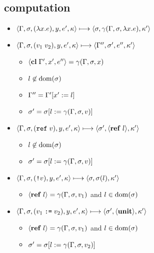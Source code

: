 \documentclass{article}
\begin{document}
\begin{minipage}{\textwidth}
\begin{minipage}[t]{0.50\textwidth}

\subsection{computation}
\begin{itemize}
\item $\langle\Gamma,\sigma,(\lambda x.e),y,e',\kappa\rangle \longmapsto \langle \sigma,\gamma(\Gamma,\sigma,\lambda x.e), \kappa'\rangle$
\item $\langle\Gamma,\sigma,(v_1\;v_2),y,e',\kappa\rangle \longmapsto \langle\Gamma'',\sigma',e'',\kappa'\rangle$

\begin{itemize}
\item $\langle\mathbf{cl}\; \Gamma',x',e''\rangle=\gamma(\Gamma,\sigma,x)$
\item $l\not\in\operatorname{dom}(\sigma)$
\item $\Gamma''=\Gamma'[x':= l]$
\item $\sigma'=\sigma[l:= \gamma(\Gamma,\sigma,v)]$
\end{itemize}

\item $\langle\Gamma,\sigma,(\mathtt{ref}\; v),y,e',\kappa\rangle \longmapsto \langle\sigma', \langle\mathbf{ref}\; l\rangle,\kappa'\rangle$

\begin{itemize}
  \item $l\not\in\operatorname{dom}(\sigma)$
  \item $\sigma'=\sigma[l:= \gamma(\Gamma,\sigma,v)]$
\end{itemize}

\item $\langle\Gamma,\sigma,(\text{\texttt{!}}v),y,e',\kappa\rangle \longmapsto \langle\sigma, \sigma(l),\kappa'\rangle$

\begin{itemize}
\item $\langle\mathbf{ref}\; l\rangle=\gamma(\Gamma,\sigma,v_1)$ and $l\in\operatorname{dom}(\sigma)$
\end{itemize}

\item $\langle\Gamma,\sigma,(v_1\; \text{\texttt{:=}}\; v_2),y,e',\kappa\rangle \longmapsto \langle\sigma',\langle\mathbf{unit}\rangle,\kappa'\rangle$

\begin{itemize}
\item $\langle\mathbf{ref}\; l\rangle=\gamma(\Gamma,\sigma,v_1)$ and $l\in\operatorname{dom}(\sigma)$
\item $\sigma'=\sigma[l:= \gamma(\Gamma,\sigma,v_2)]$
\end{itemize}
\end{itemize}


\end{minipage}
\end{minipage}
\end{document}
